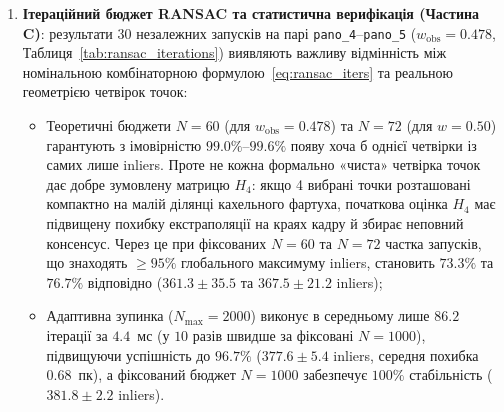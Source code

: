 \documentclass[14pt, a4paper]{extarticle}
\begin{document}
\begin{enumerate}
    \item \textbf{Ітераційний бюджет RANSAC та статистична верифікація (Частина C)}: результати $30$ незалежних запусків на парі \texttt{pano\_4}--\texttt{pano\_5} ($w_{\text{obs}} = 0.478$, Таблиця~\ref{tab:ransac_iterations}) виявляють важливу відмінність між номінальною комбінаторною формулою~\eqref{eq:ransac_iters} та реальною геометрією четвірок точок:
    \begin{itemize}
        \item Теоретичні бюджети $N=60$ (для $w_{\text{obs}}=0.478$) та $N=72$ (для $w=0.50$) гарантують з імовірністю $99.0\%$--$99.6\%$ появу хоча б однієї четвірки із самих лише inliers. Проте не кожна формально «чиста» четвірка точок дає добре зумовлену матрицю $H_4$: якщо 4 вибрані точки розташовані компактно на малій ділянці кахельного фартуха, початкова оцінка $H_4$ має підвищену похибку екстраполяції на краях кадру й збирає неповний консенсус. Через це при фіксованих $N=60$ та $N=72$ частка запусків, що знаходять $\ge 95\%$ глобального максимуму inliers, становить $73.3\%$ та $76.7\%$ відповідно ($361.3 \pm 35.5$ та $367.5 \pm 21.2$ inliers);
        \item Адаптивна зупинка ($N_{\max}=2000$) виконує в середньому лише $86.2$ ітерації за $4.4$~мс (у $10$ разів швидше за фіксовані $N=1000$), підвищуючи успішність до $\mathbf{96.7\%}$ ($377.6 \pm 5.4$ inliers, середня похибка $0.68$~пк), а фіксований бюджет $N=1000$ забезпечує $100\%$ стабільність ($381.8 \pm 2.2$ inliers).
    \end{itemize}


\end{enumerate}
\end{document}
